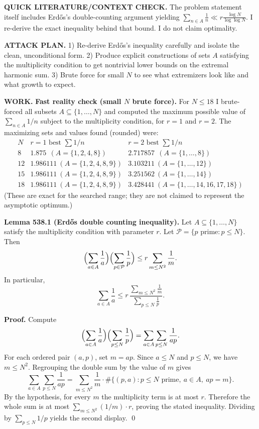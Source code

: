 \noindent\textbf{QUICK LITERATURE/CONTEXT CHECK.}
The problem statement itself includes Erd\H{o}s's double-counting argument yielding
\(\sum_{n\in A} \frac{1}{n} \ll r \frac{\log N}{\log\log N}\).
I re-derive the exact inequality behind that bound. I do not claim optimality.

\noindent\textbf{ATTACK PLAN.}
1) Re-derive Erd\H{o}s's inequality carefully and isolate the clean, unconditional form.
2) Produce explicit constructions of sets $A$ satisfying the multiplicity condition to get nontrivial lower bounds on the extremal harmonic sum.
3) Brute force for small $N$ to see what extremizers look like and what growth to expect.

\noindent\textbf{WORK.}
\textbf{Fast reality check (small $N$ brute force).}
For $N\le 18$ I brute-forced all subsets $A\subseteq\{1,\dots,N\}$ and computed the maximum possible value of $\sum_{n\in A}1/n$ subject to the multiplicity condition, for $r=1$ and $r=2$.
The maximizing sets and values found (rounded) were:
\[
\begin{array}{c|l|l}
N & r=1\text{ best }\sum 1/n & r=2\text{ best }\sum 1/n\\\hline
8 & 1.875\ \ (A=\{1,2,4,8\}) & 2.717857\ \ (A=\{1,\dots,8\})\\
12 & 1.986111\ (A=\{1,2,4,8,9\}) & 3.103211\ (A=\{1,\dots,12\})\\
15 & 1.986111\ (A=\{1,2,4,8,9\}) & 3.251562\ (A=\{1,\dots,14\})\\
18 & 1.986111\ (A=\{1,2,4,8,9\}) & 3.428441\ (A=\{1,\dots,14,16,17,18\})
\end{array}
\]
(These are exact for the searched range; they are not claimed to represent the asymptotic optimum.)

\medskip
\textbf{Lemma 538.1 (Erd\H{o}s double counting inequality).}
Let $A\subseteq\{1,\dots,N\}$ satisfy the multiplicity condition with parameter $r$.
Let $\mathcal P=\{p\text{ prime}: p\le N\}$.
Then
\[
\Bigl(\sum_{a\in A}\frac{1}{a}\Bigr)\Bigl(\sum_{p\in\mathcal P}\frac{1}{p}\Bigr)
\le r\sum_{m\le N^2}\frac{1}{m}.
\]
In particular,
\[
\sum_{a\in A}\frac{1}{a}\le r\,\frac{\sum_{m\le N^2}\frac{1}{m}}{\sum_{p\le N}\frac{1}{p}}.
\]

\textbf{Proof.}
Compute
\[
\Bigl(\sum_{a\in A}\frac{1}{a}\Bigr)\Bigl(\sum_{p\le N}\frac{1}{p}\Bigr)
=\sum_{a\in A}\sum_{p\le N}\frac{1}{ap}.
\]
For each ordered pair $(a,p)$, set $m=ap$. Since $a\le N$ and $p\le N$, we have $m\le N^2$.
Regrouping the double sum by the value of $m$ gives
\[
\sum_{a\in A}\sum_{p\le N}\frac{1}{ap}
=\sum_{m\le N^2}\frac{1}{m}\cdot \#\{(p,a): p\le N\text{ prime},\ a\in A,\ ap=m\}.
\]
By the hypothesis, for every $m$ the multiplicity term is at most $r$.
Therefore the whole sum is at most
\(\sum_{m\le N^2} (1/m)\cdot r\), proving the stated inequality.
Dividing by $\sum_{p\le N}1/p$ yields the second display. \qed

